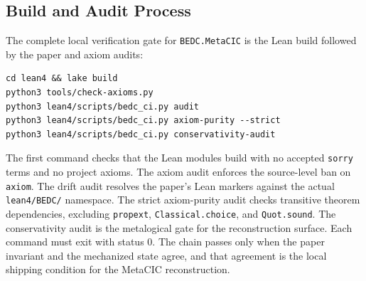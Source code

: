\subsection{Build and Audit Process}\label{subsec:reconstruction-build-audit-process}

The complete local verification gate for \texttt{BEDC.MetaCIC} is the Lean
build followed by the paper and axiom audits:

\begin{verbatim}
cd lean4 && lake build
python3 tools/check-axioms.py
python3 lean4/scripts/bedc_ci.py audit
python3 lean4/scripts/bedc_ci.py axiom-purity --strict
python3 lean4/scripts/bedc_ci.py conservativity-audit
\end{verbatim}

The first command checks that the Lean modules build with no accepted
\texttt{sorry} terms and no project axioms. The axiom audit enforces the
source-level ban on \texttt{axiom}. The drift audit resolves the paper's Lean
markers against the actual \texttt{lean4/BEDC/} namespace. The strict
axiom-purity audit checks transitive theorem dependencies, excluding
\texttt{propext}, \texttt{Classical.choice}, and \texttt{Quot.sound}. The
conservativity audit is the metalogical gate for the reconstruction surface.
Each command must exit with status $0$. The chain passes only when the paper
invariant and the mechanized state agree, and that agreement is the local
shipping condition for the MetaCIC reconstruction.
